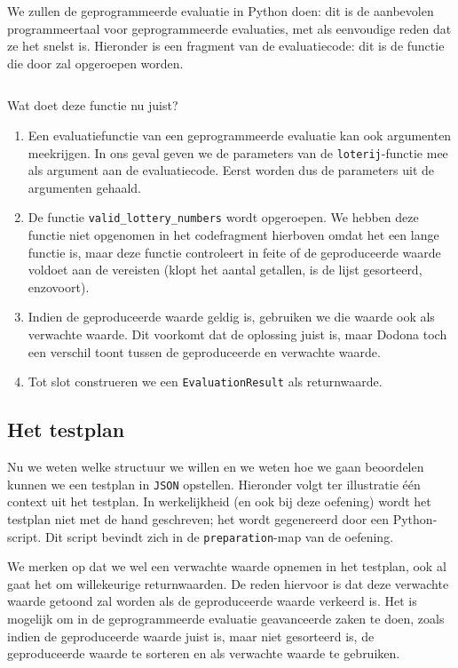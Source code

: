 We zullen de geprogrammeerde evaluatie in Python doen: dit is de aanbevolen programmeertaal voor geprogrammeerde evaluaties, met als eenvoudige reden dat ze het snelst is.
Hieronder is een fragment van de evaluatiecode: dit is de functie die door \tested{} zal opgeroepen worden.

\inputminted[firstline=42,lastline=49]{python}{sources/lotto-evaluator.py}

Wat doet deze functie nu juist?

\begin{enumerate}
    \item Een evaluatiefunctie van een geprogrammeerde evaluatie kan ook argumenten meekrijgen.
    In ons geval geven we de parameters van de \texttt{loterij}-functie mee als argument aan de evaluatiecode.
    Eerst worden dus de parameters uit de argumenten gehaald.
    \item De functie \texttt{valid\_lottery\_numbers} wordt opgeroepen.
    We hebben deze functie niet opgenomen in het codefragment hierboven omdat het een lange functie is, maar deze functie controleert in feite of de geproduceerde waarde voldoet aan de vereisten (klopt het aantal getallen, is de lijst gesorteerd, enzovoort).
    \item Indien de geproduceerde waarde geldig is, gebruiken we die waarde ook als verwachte waarde.
    Dit voorkomt dat de oplossing juist is, maar Dodona toch een verschil toont tussen de geproduceerde en verwachte waarde.
    \item Tot slot construeren we een \texttt{EvaluationResult} als returnwaarde.
\end{enumerate}

\subsection{Het testplan}\label{subsec:oefening-lotto-testplan}

Nu we weten welke structuur we willen en we weten hoe we gaan beoordelen kunnen we een testplan in \texttt{JSON} opstellen.
Hieronder volgt ter illustratie één context uit het testplan.
In werkelijkheid (en ook bij deze oefening) wordt het testplan niet met de hand geschreven;
het wordt gegenereerd door een Python-script.
Dit script bevindt zich in de \texttt{preparation}-map van de oefening.

We merken op dat we wel een verwachte waarde opnemen in het testplan, ook al gaat het om willekeurige returnwaarden.
De reden hiervoor is dat deze verwachte waarde getoond zal worden als de geproduceerde waarde verkeerd is.
Het is mogelijk om in de geprogrammeerde evaluatie geavanceerde zaken te doen, zoals indien de geproduceerde waarde juist is, maar niet gesorteerd is, de geproduceerde waarde te sorteren en als verwachte waarde te gebruiken.

